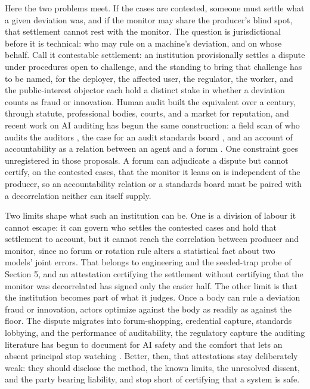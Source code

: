 \documentclass[11pt]{article}
\begin{document}
Here the two problems meet. If the cases are contested, someone must settle what a given deviation was, and if the monitor may share the producer's blind spot, that settlement cannot rest with the monitor. The question is jurisdictional before it is technical: who may rule on a machine's deviation, and on whose behalf. Call it contestable settlement: an institution provisionally settles a dispute under procedures open to challenge, and the standing to bring that challenge has to be named, for the deployer, the affected user, the regulator, the worker, and the public-interest objector each hold a distinct stake in whether a deviation counts as fraud or innovation. Human audit built the equivalent over a century, through statute, professional bodies, courts, and a market for reputation, and recent work on AI auditing has begun the same construction: a field scan of who audits the auditors \citep{costanzachock2022}, the case for an audit standards board \citep{manheim2025}, and an account of accountability as a relation between an agent and a forum \citep{novelli2024}. One constraint goes unregistered in those proposals. A forum can adjudicate a dispute but cannot certify, on the contested cases, that the monitor it leans on is independent of the producer, so an accountability relation or a standards board must be paired with a decorrelation neither can itself supply.

Two limits shape what such an institution can be. One is a division of labour it cannot escape: it can govern who settles the contested cases and hold that settlement to account, but it cannot reach the correlation between producer and monitor, since no forum or rotation rule alters a statistical fact about two models' joint errors. That belongs to engineering and the seeded-trap probe of Section 5, and an attestation certifying the settlement without certifying that the monitor was decorrelated has signed only the easier half. The other limit is that the institution becomes part of what it judges. Once a body can rule a deviation fraud or innovation, actors optimize against the body as readily as against the floor. The dispute migrates into forum-shopping, credential capture, standards lobbying, and the performance of auditability, the regulatory capture the auditing literature has begun to document for AI safety \citep{regulatorycapture_aisoc} and the comfort that lets an absent principal stop watching \citep{bainbridge1983,parasuraman2000}. Better, then, that attestations stay deliberately weak: they should disclose the method, the known limits, the unresolved dissent, and the party bearing liability, and stop short of certifying that a system is safe.
\end{document}
